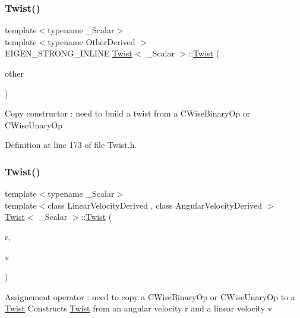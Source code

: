 \subsubsection{\texorpdfstring{Twist()}{Twist()}\hspace{0.1cm}{\footnotesize\ttfamily [5/7]}}
{\footnotesize\ttfamily template$<$typename \+\_\+\+Scalar$>$ \\
template$<$typename Other\+Derived $>$ \\
E\+I\+G\+E\+N\+\_\+\+S\+T\+R\+O\+N\+G\+\_\+\+I\+N\+L\+I\+NE \hyperlink{class_twist}{Twist}$<$ \+\_\+\+Scalar $>$\+::\hyperlink{class_twist}{Twist} (\begin{DoxyParamCaption}\item[{const Matrix\+Base$<$ Other\+Derived $>$ \&}]{other }\end{DoxyParamCaption})\hspace{0.3cm}{\ttfamily [inline]}}

Copy constructor \+: need to build a twist from a C\+Wise\+Binary\+Op or C\+Wise\+Unary\+Op 

Definition at line 173 of file Twist.\+h.

\hypertarget{class_twist_ac948ffd308a2af9bb8fbd68cda5e1331}{}\label{class_twist_ac948ffd308a2af9bb8fbd68cda5e1331} 
\subsubsection{\texorpdfstring{Twist()}{Twist()}\hspace{0.1cm}{\footnotesize\ttfamily [6/7]}}
{\footnotesize\ttfamily template$<$typename \+\_\+\+Scalar$>$ \\
template$<$class Linear\+Velocity\+Derived , class Angular\+Velocity\+Derived $>$ \\
\hyperlink{class_twist}{Twist}$<$ \+\_\+\+Scalar $>$\+::\hyperlink{class_twist}{Twist} (\begin{DoxyParamCaption}\item[{const \hyperlink{class_lie_algebra_base}{Lie\+Algebra\+Base}$<$ Matrix$<$ Scalar, 3, 1 $>$, Angular\+Velocity\+Derived $>$ \&}]{r,  }\item[{const Matrix\+Base$<$ Linear\+Velocity\+Derived $>$ \&}]{v }\end{DoxyParamCaption})\hspace{0.3cm}{\ttfamily [inline]}}

Assignement operator \+: need to copy a C\+Wise\+Binary\+Op or C\+Wise\+Unary\+Op to a \hyperlink{class_twist}{Twist} Constructs \hyperlink{class_twist}{Twist} from an angular velocity {\ttfamily r} and a linear velocity {\ttfamily v} 

